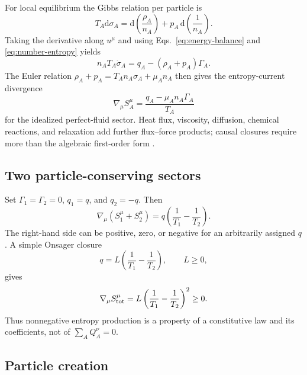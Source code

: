 \documentclass[aps,prd,reprint,superscriptaddress,nofootinbib,floatfix]{revtex4-2}
\newcommand{\dd}{\mathrm{d}}
\begin{document}
For local equilibrium the Gibbs relation per particle is
\begin{equation}
 T_A\dd\sigma_A
 =\dd\!\left(\frac{\rho_A}{n_A}\right)
 +p_A\,\dd\!\left(\frac{1}{n_A}\right).
 \label{eq:gibbs}
\end{equation}
Taking the derivative along \(u^\mu\) and using
Eqs.~\eqref{eq:energy-balance} and \eqref{eq:number-entropy} yields
\begin{equation}
 n_AT_A\dot\sigma_A
 =q_A-(\rho_A+p_A)\Gamma_A .
 \label{eq:specific-entropy}
\end{equation}
The Euler relation
\(\rho_A+p_A=T_An_A\sigma_A+\mu_An_A\) then gives the entropy-current
divergence
\begin{equation}
 \boxed{\;
 \nabla_\mu S_A^\mu
 =\frac{q_A-\mu_An_A\Gamma_A}{T_A}
 \;}
 \label{eq:entropy-production}
\end{equation}
for the idealized perfect-fluid sector.  Heat flux, viscosity, diffusion,
chemical reactions, and relaxation add further flux--force products; causal
closures require more than the algebraic first-order form
\cite{israel_stewart}.

\subsection{Two particle-conserving sectors}

Set \(\Gamma_1=\Gamma_2=0\), \(q_1=q\), and \(q_2=-q\).  Then
\begin{equation}
 \nabla_\mu(S_1^\mu+S_2^\mu)
 =q\left(\frac{1}{T_1}-\frac{1}{T_2}\right).
 \label{eq:two-sector-entropy}
\end{equation}
The right-hand side can be positive, zero, or negative for an arbitrarily
assigned \(q\).  A simple Onsager closure
\begin{equation}
 q=L\left(\frac{1}{T_1}-\frac{1}{T_2}\right),
 \qquad L\geq0,
 \label{eq:onsager}
\end{equation}
gives
\begin{equation}
 \nabla_\mu S_{\rm tot}^\mu
 =L\left(\frac{1}{T_1}-\frac{1}{T_2}\right)^2\geq0.
 \label{eq:onsager-positive}
\end{equation}
Thus nonnegative entropy production is a property of a constitutive law and
its coefficients, not of \(\sum_AQ_A^\nu=0\).

\subsection{Particle creation}
\end{document}
